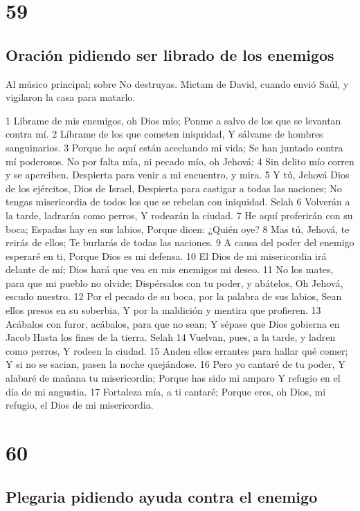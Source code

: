 \chapter{59}

\section*{Oración pidiendo ser librado de los enemigos}

Al músico principal; sobre No destruyas. Mictam de David, cuando envió Saúl, y vigilaron la casa para matarlo.

1 Líbrame de mis enemigos, oh Dios mío;
Ponme a salvo de los que se levantan contra mí.
2 Líbrame de los que cometen iniquidad,
Y sálvame de hombres sanguinarios.
3 Porque he aquí están acechando mi vida;
Se han juntado contra mí poderosos.
No por falta mía, ni pecado mío, oh Jehová;
4 Sin delito mío corren y se aperciben.
Despierta para venir a mi encuentro, y mira.
5 Y tú, Jehová Dios de los ejércitos, Dios de Israel,
Despierta para castigar a todas las naciones;
No tengas misericordia de todos los que se rebelan con iniquidad. Selah
6 Volverán a la tarde, ladrarán como perros,
Y rodearán la ciudad.
7 He aquí proferirán con su boca;
Espadas hay en sus labios,
Porque dicen: ¿Quién oye?
8 Mas tú, Jehová, te reirás de ellos;
Te burlarás de todas las naciones.
9 A causa del poder del enemigo esperaré en ti,
Porque Dios es mi defensa.
10 El Dios de mi misericordia irá delante de mí;
Dios hará que vea en mis enemigos mi deseo.
11 No los mates, para que mi pueblo no olvide;
Dispérsalos con tu poder, y abátelos,
Oh Jehová, escudo nuestro.
12 Por el pecado de su boca, por la palabra de sus labios,
Sean ellos presos en su soberbia,
Y por la maldición y mentira que profieren.
13 Acábalos con furor, acábalos, para que no sean;
Y sépase que Dios gobierna en Jacob
Hasta los fines de la tierra. Selah
14 Vuelvan, pues, a la tarde, y ladren como perros,
Y rodeen la ciudad.
15 Anden ellos errantes para hallar qué comer;
Y si no se sacian, pasen la noche quejándose.
16 Pero yo cantaré de tu poder,
Y alabaré de mañana tu misericordia;
Porque has sido mi amparo
Y refugio en el día de mi angustia.
17 Fortaleza mía, a ti cantaré;
Porque eres, oh Dios, mi refugio, el Dios de mi misericordia.

\chapter{60}

\section*{Plegaria pidiendo ayuda contra el enemigo}

